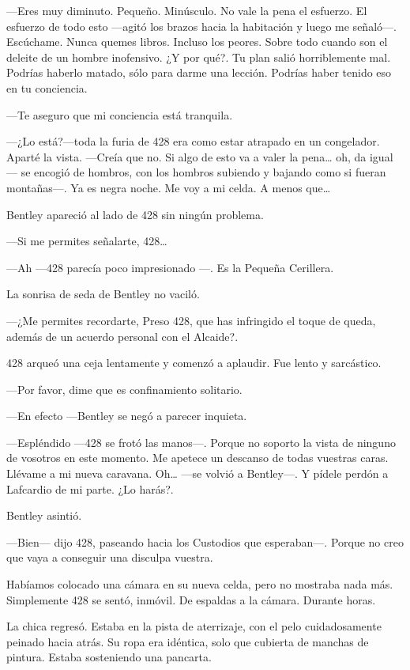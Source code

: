 ---Eres muy diminuto. Pequeño. Minúsculo. No vale la pena el esfuerzo.
El esfuerzo de todo esto ---agitó los brazos hacia la habitación y luego
me señaló---. Escúchame. Nunca quemes libros. Incluso los peores. Sobre
todo cuando son el deleite de un hombre inofensivo. ¿Y por qué?. Tu plan
salió horriblemente mal. Podrías haberlo matado, sólo para darme una
lección. Podrías haber tenido eso en tu conciencia.

---Te aseguro que mi conciencia está tranquila.

---¿Lo está?---toda la furia de 428 era como estar atrapado en un
congelador. Aparté la vista. ---Creía que no. Si algo de esto va a valer
la pena\ldots{} oh, da igual --- se encogió de hombros, con los hombros
subiendo y bajando como si fueran montañas---. Ya es negra noche. Me voy
a mi celda. A menos que\ldots{}

Bentley apareció al lado de 428 sin ningún problema.

---Si me permites señalarte, 428\ldots{}

---Ah ---428 parecía poco impresionado ---. Es la Pequeña Cerillera.

La sonrisa de seda de Bentley no vaciló.

---¿Me permites recordarte, Preso 428, que has infringido el toque de
queda, además de un acuerdo personal con el Alcaide?.

428 arqueó una ceja lentamente y comenzó a aplaudir. Fue lento y
sarcástico.

---Por favor, dime que es confinamiento solitario.

---En efecto ---Bentley se negó a parecer inquieta.

---Espléndido ---428 se frotó las manos---. Porque no soporto la vista
de ninguno de vosotros en este momento. Me apetece un descanso de todas
vuestras caras. Llévame a mi nueva caravana. Oh\ldots{} ---se volvió a
Bentley---. Y pídele perdón a Lafcardio de mi parte. ¿Lo harás?.

Bentley asintió.

---Bien--- dijo 428, paseando hacia los Custodios que esperaban---.
Porque no creo que vaya a conseguir una disculpa vuestra.

Habíamos colocado una cámara en su nueva celda, pero no mostraba nada
más. Simplemente 428 se sentó, inmóvil. De espaldas a la cámara. Durante
horas.

La chica regresó. Estaba en la pista de aterrizaje, con el pelo
cuidadosamente peinado hacia atrás. Su ropa era idéntica, solo que
cubierta de manchas de pintura. Estaba sosteniendo una pancarta.

